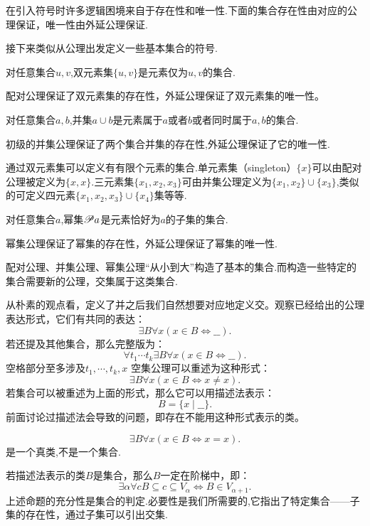 \begin{note}
    在引入符号时许多逻辑困境来自于存在性和唯一性.下面的集合存在性由对应的公理保证，唯一性由外延公理保证.
\end{note}
接下来类似从公理出发定义一些基本集合的符号.
\begin{definition}
    对任意集合$u,v$,双元素集$\{u,v\}$是元素仅为$u,v$的集合.
\end{definition}
配对公理保证了双元素集的存在性，外延公理保证了双元素集的唯一性。

\begin{definition}
    [并集（union）]
    对任意集合$a,b$,并集$a\cup b$是元素属于$a$或者$b$或者同时属于$a,b$的集合.
\end{definition}

初级的并集公理保证了两个集合并集的存在性,外延公理保证了它的唯一性.

通过双元素集可以定义有有限个元素的集合.单元素集（singleton）$\{x\}$可以由配对公理被定义为$\{x,x\}$.三元素集$\{x_1,x_2,x_3\}$可由并集公理定义为$\{x_1,x_2\}\cup\{x_3\}$,类似的可定义四元素$\{x_1,x_2,x_3\}\cup\{x_4\}$集等等.

\begin{definition}
    对任意集合$a$,幂集$\mathscr{P} a$是元素恰好为$a$的子集的集合.
\end{definition}

幂集公理保证了幂集的存在性，外延公理保证了幂集的唯一性.

\begin{note}
    配对公理、并集公理、幂集公理“从小到大”构造了基本的集合.而构造一些特定的集合需要新的公理，交集属于这类集合.
\end{note}

从朴素的观点看，定义了并之后我们自然想要对应地定义交。观察已经给出的公理表达形式，它们有共同的表达：
\[\exists B\forall x(x\in B\iff \_\_).\]
若还提及其他集合，那么完整版为：
\[\forall t_1\cdots t_k\exists B\forall x(x\in B\iff \_\_).\]
空格部分至多涉及$t_1,\cdots,t_k,x$
空集公理可以重述为这种形式：
\[\exists B\forall x(x\in B\iff x\ne x).\]
若集合可以被重述为上面的形式，那么它可以用描述法表示：
\[B=\{x\mid\_\_\}.\]
前面讨论过描述法会导致的问题，即存在不能用这种形式表示的类。
\begin{example}
    \[\exists B\forall x(x\in B\iff x=x).\]是一个真类,不是一个集合.
\end{example}
若描述法表示的类$B$是集合，那么$B$一定在阶梯中，即：
\[\exists\alpha\forall c B\subseteq c\subseteq V_\alpha\iff B\in V_{\alpha +1}.\]
上述命题的充分性是集合的判定.必要性是我们所需要的,它指出了特定集合——子集的存在性，通过子集可以引出交集.

